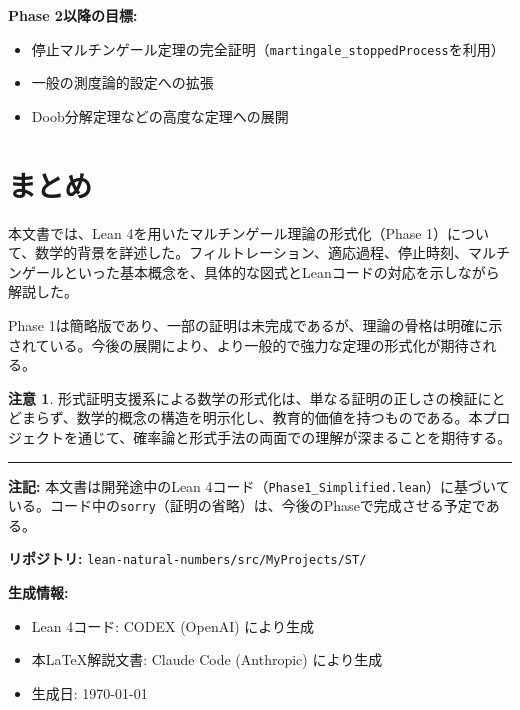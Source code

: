 \documentclass[a4paper,11pt]{ltjsarticle}
\theoremstyle{definition}
\newtheorem{remark}[definition]{注意}
\begin{document}
\textbf{Phase 2以降の目標:}
\begin{itemize}
  \item 停止マルチンゲール定理の完全証明（\texttt{martingale\_stoppedProcess}を利用）
  \item 一般の測度論的設定への拡張
  \item Doob分解定理などの高度な定理への展開
\end{itemize}

\section{まとめ}

本文書では、Lean 4を用いたマルチンゲール理論の形式化（Phase 1）について、数学的背景を詳述した。フィルトレーション、適応過程、停止時刻、マルチンゲールといった基本概念を、具体的な図式とLeanコードの対応を示しながら解説した。

Phase 1は簡略版であり、一部の証明は未完成であるが、理論の骨格は明確に示されている。今後の展開により、より一般的で強力な定理の形式化が期待される。

\begin{remark}
形式証明支援系による数学の形式化は、単なる証明の正しさの検証にとどまらず、数学的概念の構造を明示化し、教育的価値を持つものである。本プロジェクトを通じて、確率論と形式手法の両面での理解が深まることを期待する。
\end{remark}

\vspace{1cm}
\hrule
\vspace{0.5cm}

\noindent
\textbf{注記:} 本文書は開発途中のLean 4コード（\texttt{Phase1\_Simplified.lean}）に基づいている。コード中の\texttt{sorry}（証明の省略）は、今後のPhaseで完成させる予定である。

\noindent
\textbf{リポジトリ:} \texttt{lean-natural-numbers/src/MyProjects/ST/}

\noindent
\textbf{生成情報:}
\begin{itemize}
  \item Lean 4コード: CODEX (OpenAI) により生成
  \item 本\LaTeX 解説文書: Claude Code (Anthropic) により生成
  \item 生成日: \today
\end{itemize}
\end{document}
